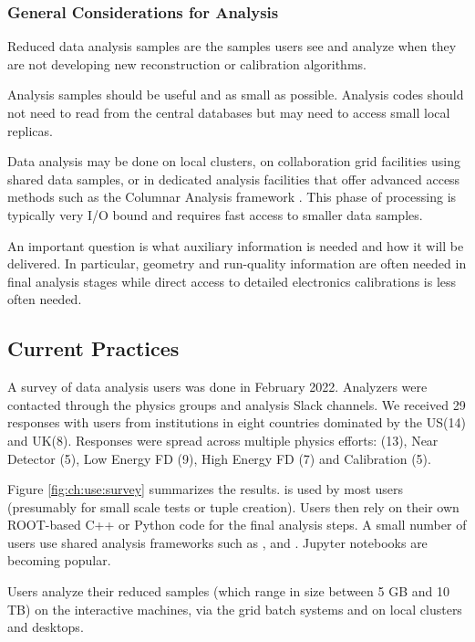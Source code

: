\documentclass[../main-v1.tex]{subfiles}
\begin{document}
\subsubsection{General Considerations for Analysis}
Reduced data analysis samples  are the samples users see and analyze when they are not developing new reconstruction  or calibration algorithms. 

Analysis samples should be useful and as small as possible.  Analysis codes should not need to read from the central databases but may need to access small local replicas. 

Data analysis may be done on local clusters, on collaboration grid facilities using shared data samples, or in dedicated analysis facilities that offer advanced access methods such as the Columnar Analysis framework .  %
This phase of processing is typically very I/O bound and requires fast access to smaller data samples. 


An important question is what auxiliary information is needed and how it will be delivered. In particular, geometry and run-quality information are often needed in final analysis stages while direct access to detailed electronics calibrations is less often needed. 

\subsection{Current Practices}

A survey of data analysis users was done in February 2022.  Analyzers were contacted through the physics groups and analysis Slack channels.  We received 29 responses with users from institutions in eight countries dominated by the US(14) and UK(8). 
Responses were spread across multiple physics efforts: 	(13),
Near Detector	(5),
Low Energy FD	(9),
High Energy FD	(7) and 
Calibration	(5).  



Figure \ref{fig:ch:use:survey} summarizes the results.   is used by most users (presumably for small scale tests or tuple creation).  Users then rely on their own ROOT-based C++ or Python code for the final analysis steps.  A small number of users use shared analysis frameworks such as ,  and .  Jupyter notebooks are becoming popular. %

Users analyze their reduced samples (which range in size between 5 GB and 10 TB) on the  interactive machines, via the grid batch systems and on local clusters and desktops. 
\end{document}
